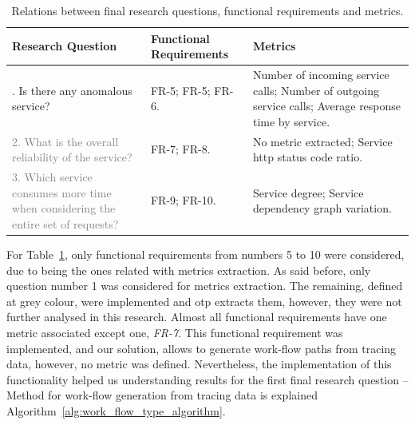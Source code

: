 \begin{table}[H]
    \caption{Relations between final research questions, functional requirements and metrics.}
    \label{table:research_questions_frs_and_metrics}
    \centering
    \begin{tabularx}{\linewidth} {
        |>{\hsize=0.75\hsize}X|
        >{\hsize=0.60\hsize}X|
        >{\hsize=1.65\hsize}X|}
        \hline
        \textbf{Research} \newline \textbf{Question}
         & \textbf{Functional} \newline \textbf{Requirements}
         & \textbf{Metrics}                                   \\ \hline \hline
        1. Is there any anomalous service?
         & FR-5; \newline
        FR-5; \newline
        FR-6.
         & Number of incoming service calls; \newline
        Number of outgoing service calls; \newline
        Average response time by service.                     \\ \hline
        \textcolor{gray}{2. What is the overall reliability of the service?}
         & FR-7; \newline
        FR-8.
         & No metric extracted; \newline
        Service \gls{http} status code ratio.                 \\ \hline
        \textcolor{gray}{3. Which service consumes more time when considering the entire set of requests?}
         & FR-9; \newline
        FR-10.
         & Service degree; \newline
        Service dependency graph variation.                   \\ \hline
    \end{tabularx}
\end{table}

For Table~\ref{table:research_questions_frs_and_metrics}, only functional requirements from numbers 5 to 10 were considered, due to being the ones related with metrics extraction. As said before, only question number 1 was considered for metrics extraction. The remaining, defined at grey colour, were implemented and \gls{otp} extracts them, however, they were not further analysed in this research. Almost all functional requirements have one metric associated except one, \emph{FR-7}. This functional requirement was implemented, and our solution, allows to generate work-flow paths from tracing data, however, no metric was defined. Nevertheless, the implementation of this functionality helped us understanding results for the first final research question -- Method for work-flow generation from tracing data is explained Algorithm~\ref{alg:work_flow_type_algorithm}.

